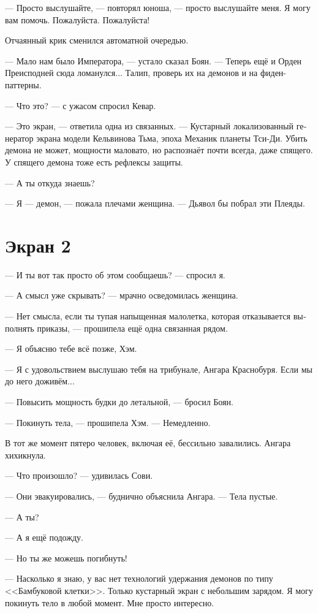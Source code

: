 \documentclass[a4paper,12pt,fleqn]{book}\usepackage{polyglossia}\setdefaultlanguage[babelshorthands=true]{russian}\setotherlanguage{english}\defaultfontfeatures{Ligatures=TeX,Mapping=tex-text}
\begin{document}
--- Просто выслушайте, --- повторял юноша, --- просто выслушайте меня.
Я могу вам помочь.
Пожалуйста.
Пожалуйста!

Отчаянный крик сменился автоматной очередью.

--- Мало нам было Императора, --- устало сказал Боян.
--- Теперь ещё и Орден Преисподней сюда ломанулся...
Талип, проверь их на демонов и на фиден-паттерны.

--- Что это? --- с ужасом спросил Кевар.

--- Это экран, --- ответила одна из связанных.
--- Кустарный локализованный генератор экрана модели Кельвинова Тьма, эпоха Механик планеты Тси-Ди.
Убить демона не может, мощности маловато, но распознаёт почти всегда, даже спящего.
У спящего демона тоже есть рефлексы защиты.

--- А ты откуда знаешь?

--- Я --- демон, --- пожала плечами женщина.
--- Дьявол бы побрал эти Плеяды.

\section{Экран 2}

--- И ты вот так просто об этом сообщаешь? --- спросил я.

--- А смысл уже скрывать? --- мрачно осведомилась женщина.

--- Нет смысла, если ты тупая напыщенная малолетка, которая отказывается выполнять приказы, --- прошипела ещё одна связанная рядом.

--- Я объясню тебе всё позже, Хэм.

--- Я с удовольствием выслушаю тебя на трибунале, Ангара Краснобуря.
Если мы до него доживём...

--- Повысить мощность будки до летальной, --- бросил Боян.

--- Покинуть тела, --- прошипела Хэм.
--- Немедленно.

В тот же момент пятеро человек, включая её, бессильно завалились.
Ангара хихикнула.

--- Что произошло? --- удивилась Сови.

--- Они эвакуировались, --- буднично объяснила Ангара.
--- Тела пустые.

--- А ты?

--- А я ещё подожду.

--- Но ты же можешь погибнуть!

--- Насколько я знаю, у вас нет технологий удержания демонов по типу <<Бамбуковой клетки>>.
Только кустарный экран с небольшим зарядом.
Я могу покинуть тело в любой момент.
Мне просто интересно.
\end{document}
